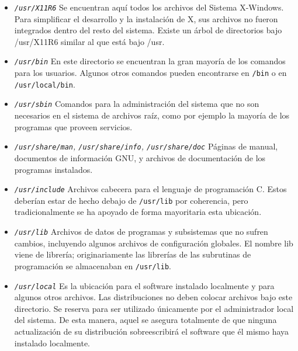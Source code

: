\begin{itemize} 
	
	\item \textit{\texttt{/usr/X11R6}}
	 Se encuentran aquí todos los archivos del Sistema
	X-Windows. Para simplificar el desarrollo y la instalación de X,  sus
	archivos no fueron integrados dentro del resto del sistema. Existe un
	árbol de directorios bajo /usr/X11R6 similar al que está bajo /usr.
	


	\item \textit{\texttt{/usr/bin}}
	 En este directorio se encuentran la gran mayoría de los
	comandos para los usuarios. Algunos otros comandos pueden encontrarse en
	\texttt{/bin} o en 	\texttt{/usr/local/bin}.
	

	\item \textit{\texttt{/usr/sbin}}
	 Comandos para la administración del sistema que no son
	necesarios en el sistema de archivos raíz, como por ejemplo la mayoría
	de los programas que proveen servicios.  

	\item \textit{\texttt{/usr/share/man},
	\texttt{/usr/share/info},
	\texttt{/usr/share/doc}}  Páginas
	de manual, documentos de información GNU, y 		archivos de
	documentación de los programas instalados.
	

	\item \textit{\texttt{/usr/include}}
	 Archivos cabecera para el lenguaje de programación C.
	Estos deberían estar de hecho debajo de \texttt{/usr/lib}
	por coherencia, pero tradicionalmente se ha apoyado de forma mayoritaria
	esta ubicación.  

	\item \textit{\texttt{/usr/lib}}
	 Archivos de datos de programas y subsistemas que no
	sufren cambios, incluyendo algunos archivos de configuración globales.
	El 		nombre lib viene de librería; originariamente las
	librerías de las 			subrutinas de programación se
	almacenaban en \texttt{/usr/lib}.
	

	\item \textit{\texttt{/usr/local}}
	 Es la ubicación para el software instalado localmente y
	para algunos otros archivos.  Las distribuciones no deben colocar
	archivos bajo este directorio. Se 			reserva para ser
	utilizado únicamente por el administrador local del
	sistema. De esta manera, aquel se asegura totalmente de que ninguna
	actualización de su distribución sobreescribirá  el software que él
	mismo haya instalado localmente.  


 \end{itemize} 




